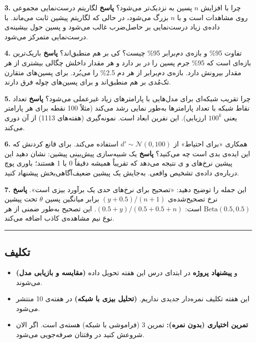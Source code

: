 \textbf{3.} چرا با افزایش \(n\) پسین به  نزدیک‌تر می‌شود؟
\textbf{پاسخ} لگاریتم درست‌نمایی مجموعی روی مشاهدات است و با \(n\) بزرگ
می‌شود، در حالی که لگاریتم پیشین ثابت می‌ماند. با داده‌ی زیاد درست‌نمایی بر
حاصل‌ضرب غالب می‌شود و پسین حول بیشینه‌ی درست‌نمایی متمرکز می‌شود.

\textbf{4.} تفاوت  95\% و بازه‌ی دم‌برابر 95\% چیست؟ کی بر هم
منطبق‌اند؟ \textbf{پاسخ}  باریک‌ترین بازه‌ای است که 95\% جرم پسین
را در بر دارد و هر مقدار داخلش چگالی بیشتری از هر مقدار بیرونش دارد.
بازه‌ی دم‌برابر از هر دم 2.5\% را می‌بُرد. برای پسین‌های متقارن تک‌مُدی بر هم
منطبق‌اند و برای پسین‌های چوله فرق دارند.

\textbf{5.} چرا تقریب شبکه‌ای برای مدل‌هایی با پارامترهای زیاد غیرعملی
می‌شود؟ \textbf{پاسخ} تعداد نقاط شبکه با تعداد پارامترها به‌طور نمایی رشد
می‌کند (مثلاً 100 نقطه برای هر پارامتر یعنی \(100^k\) ارزیابی). این نفرین
ابعاد است. نمونه‌گیری  (هفته‌های 11\lr{--}13) از آن دوری می‌کند.

\textbf{6.} همکاری «برای احتیاط» از \(d' \sim \mathcal{N}(0, 100)\)
استفاده می‌کند. برای قانع کردنش که این ایده‌ی بدی است چه می‌کنید؟
\textbf{پاسخ} یک شبیه‌سازی پیش‌بینی پیشین: نشان دهید این پیشین نرخ‌های
 و ی نتیجه می‌دهد که تقریباً همیشه دقیقاً 0 یا 1
هستند؛ باوری پوچ درباره‌ی داده‌ی تشخیص واقعی. به‌جایش یک پیشین ضعیف‌آگاهی‌بخش
پیشنهاد کنید.

\textbf{7.} این جمله را توضیح دهید: «تصحیح  برای نرخ‌های
حدی یک برآورد بیزی است». \textbf{پاسخ} نرخ تصحیح‌شده‌ی
\((y + 0.5)/(n + 1)\) برابر میانگین پسین \(\theta\) تحت پیشین
\(\mathrm{Beta}(0.5, 0.5)\) است: \((0.5 + y)/(0.5 + 0.5 + n)\). این
تصحیح به‌طور ضمنی از هر نوع نیم مشاهده‌ی کاذب اضافه می‌کند.

\begin{center}\rule{0.5\linewidth}{0.5pt}\end{center}

\subsection{تکلیف}

\begin{itemize}
\tightlist
\item
  \textbf{ (مقایسه و بازیابی مدل)} و \textbf{پیشنهاد پروژه} در
  ابتدای درس این هفته تحویل داده می‌شوند.
\item
  این هفته تکلیف نمره‌دار جدیدی نداریم. \textbf{ (تحلیل بیزی با
  شبکه)} در هفته‌ی 10 منتشر می‌شود.
\item
  \textbf{تمرین اختیاری (بدون نمره):} تمرین 3  (فراموشی با شبکه)
  هسته‌ی  است. اگر الان شروعش کنید در وقتتان صرفه‌جویی می‌شود.
\end{itemize}

